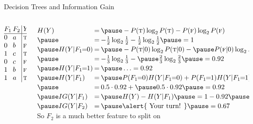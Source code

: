 \documentclass[14pt]{beamer}
\begin{document}
\begin{frame}{Decision Trees and Information Gain}
\textbf{}
\pause
\medskip
\begin{columns}[T]
\begin{column}{0.6in}
\small
$
\begin{array}{@{}l@{\hspace{2pt}}l@{\hspace{2pt}}|@{\hspace{2pt}}l@{}}
F_1 & F_2 & Y \\
\hline
0   & a   & \textsc{t} \\
0   & b   & \textsc{f} \\
1   & c   & \textsc{t} \\
0   & c   & \textsc{f} \\
1   & b   & \textsc{f} \\
1   & a   & \textsc{t} \\
\end{array}
$
\end{column}
\pause
\begin{column}{3.8in}
\small
$
\extrarowheight=2pt
\begin{array}{@{}l@{\hspace{2pt}}l@{\hspace{2pt}}l@{}}
H(Y)               & = & \pause -P(\textsc{t})\log_2 P(\textsc{t}) - P(\textsc{f})\log_2 P(\textsc{f}) \\
\pause
                   & = & -\frac{1}{2}\log_2 \frac{1}{2} - \frac{1}{2}\log_2 \frac{1}{2} \pause = 1 \\
\pause
H(Y|F_1\!\!=\!\!0) & = & \pause -P(\textsc{t}|0)\log_2 P(\textsc{t}|0) - \pause P(\textsc{f}|0)\log_2 P(\textsc{f}|0) \\
\pause
                   & = & - \frac{1}{3}\log_2 \frac{1}{3} - \pause \frac{2}{3}\log_2 \frac{2}{3} \pause = 0.92\\
\pause         
H(Y|F_1\!\!=\!\!1) & = & \pause \ldots = 0.92\\
\pause         
H(Y|F_1)           & = & \pause P(F_1\!\!=\!\!0) H(Y|F_1\!\!=\!\!0) + P(F_1\!\!=\!\!1) H(Y|F_1\!\!=\!\!1) \\
\pause         
                   & = & 0.5 \cdot 0.92 + \pause 0.5 \cdot 0.92 \pause = 0.92 \\
\pause
IG(Y|F_1)          & = & \pause H(Y) - H(Y|F_1) \pause = 1 - 0.92 \pause = 0.08 \\
\pause         
IG(Y|F_2)          & = & \pause \mbox{\alert{ Your turn! }} \pause = 0.67 \\
\end{array}
$ \\
\medskip
\pause
So $F_2$ is a much better feature to split on \hyperlink{decision-tree-exercise<2>}{}
\end{column}
\end{columns}
\end{frame}
\end{document}
